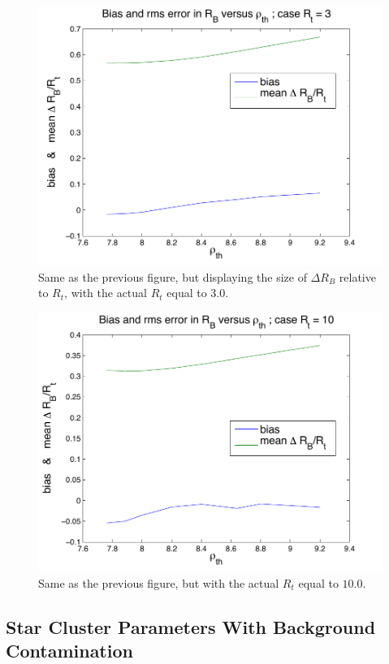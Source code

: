 \documentclass[aps,prd]{revtex4-1}
\begin{document}
\begin{figure}
\includegraphics[width=\columnwidth]{Rt3}
\caption{\label{fig:Rt3} Same as the previous figure, but displaying the size of $\Delta R_B$  relative to $R_t$, with the actual $R_t$ equal to $3.0$.}
\end{figure} 

\begin{figure}
\includegraphics[width=\columnwidth]{Rt10}
\caption{\label{fig:Rt10} Same as the previous figure, but with the actual $R_t$ equal to $10.0$.}
\end{figure} 


\subsection{Star Cluster Parameters With Background Contamination}
\label{sec:star-cluster}
\end{document}
